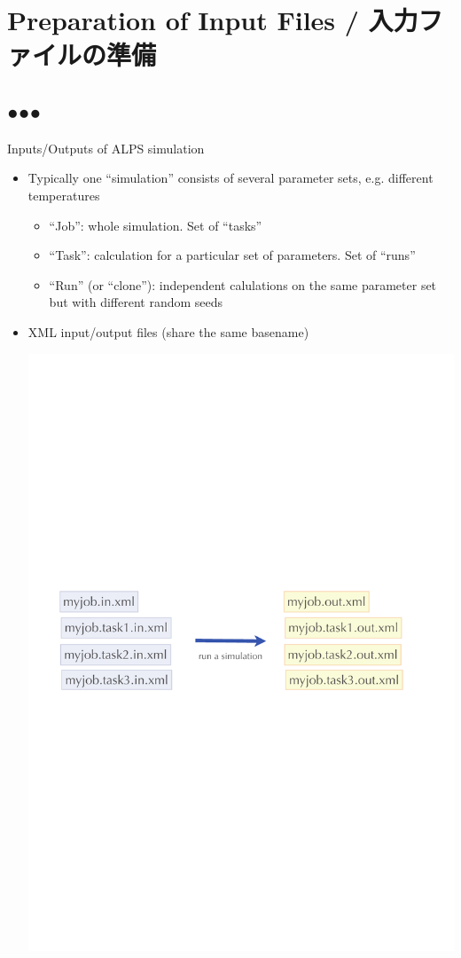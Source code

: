 \section{Preparation of Input Files / 入力ファイルの準備}
\subsection*{{\protect\color{red}●}{\protect\color{blue}●}{\protect\color{green}●}}

\begin{frame}[t,fragile]{Inputs/Outputs of ALPS simulation}
  \begin{itemize}
  \item Typically one ``simulation'' consists of several parameter sets, e.g. different temperatures
    \begin{itemize}
    \item ``Job'': whole simulation.  Set of ``tasks''
    \item ``Task'': calculation for a particular set of parameters.  Set of ``runs''
    \item ``Run'' (or ``clone''): independent calulations on the same parameter set but with different random seeds
    \end{itemize}
  \item XML input/output files (share the same basename)
  \begin{center}
    \includegraphics[width=.55\textwidth]{simulation1.pdf}
  \end{center}
  \end{itemize}
\end{frame}

